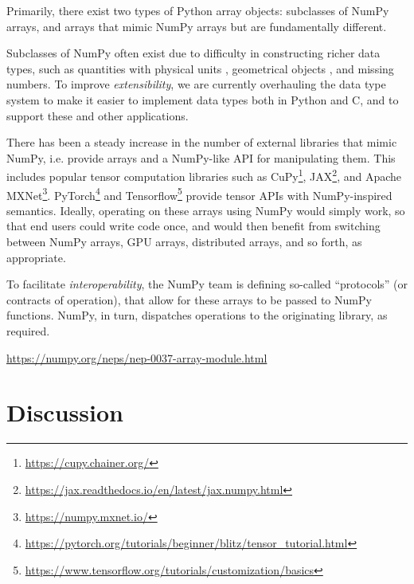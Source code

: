 Primarily, there exist two types of Python array objects: subclasses of NumPy arrays, and arrays that mimic NumPy arrays but are fundamentally different.

Subclasses of NumPy often exist due to difficulty in constructing richer data types, such as quantities with physical units \cite{astropy,Goldbaum2018,pint}, geometrical objects \cite{pygeos}, and missing numbers.  To improve {\em extensibility}, we are currently overhauling the data type system to make it easier to implement data types both in Python and C, and to support these and other applications.

There has been a steady increase in the number of external libraries that mimic NumPy, i.e. provide arrays and a NumPy-like API for manipulating them.  This includes popular tensor computation libraries such as CuPy\footnote{\url{https://cupy.chainer.org/}}, JAX\footnote{\url{https://jax.readthedocs.io/en/latest/jax.numpy.html}}, and Apache MXNet\footnote{\url{https://numpy.mxnet.io/}}.  PyTorch\footnote{\url{https://pytorch.org/tutorials/beginner/blitz/tensor\_tutorial.html}} and Tensorflow\footnote{\url{https://www.tensorflow.org/tutorials/customization/basics}} provide tensor APIs with NumPy-inspired semantics.
Ideally, operating on these arrays using NumPy would simply work, so that end users could write code once, and would then benefit from switching between NumPy arrays, GPU arrays, distributed arrays, and so forth, as appropriate.

To facilitate {\em interoperability}, the NumPy team is defining so-called ``protocols'' (or contracts of operation), that allow for these arrays to be passed to NumPy functions.  NumPy, in turn, dispatches operations to the originating library, as required.

\url{https://numpy.org/neps/nep-0037-array-module.html}


\section*{Discussion}

